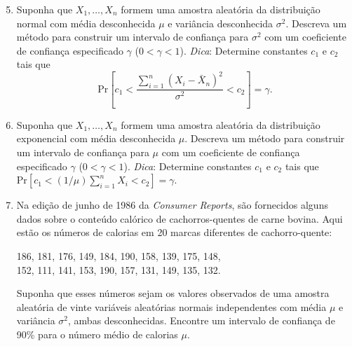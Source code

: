 \begin{enumerate}
    \setcounter{enumi}{4} %
    \item Suponha que $X_1, \dots, X_n$ formem uma amostra aleatória da distribuição normal com média desconhecida $\mu$ e variância desconhecida $\sigma^2$. Descreva um método para construir um intervalo de confiança para $\sigma^2$ com um coeficiente de confiança especificado $\gamma$ ($0 < \gamma < 1$). \textit{Dica}: Determine constantes $c_1$ e $c_2$ tais que
    $$ \text{Pr}\left[c_1 < \frac{\sum_{i=1}^{n}(X_i - \bar{X}_n)^2}{\sigma^2} < c_2\right] = \gamma. $$

    \item Suponha que $X_1, \dots, X_n$ formem uma amostra aleatória da distribuição exponencial com média desconhecida $\mu$. Descreva um método para construir um intervalo de confiança para $\mu$ com um coeficiente de confiança especificado $\gamma$ ($0 < \gamma < 1$). \textit{Dica}: Determine constantes $c_1$ e $c_2$ tais que $\text{Pr}[c_1 < (1/\mu)\sum_{i=1}^{n} X_i < c_2] = \gamma$.

    \item Na edição de junho de 1986 da \textit{Consumer Reports}, são fornecidos alguns dados sobre o conteúdo calórico de cachorros-quentes de carne bovina. Aqui estão os números de calorias em 20 marcas diferentes de cachorro-quente:
    \begin{center}
        186, 181, 176, 149, 184, 190, 158, 139, 175, 148, \\
        152, 111, 141, 153, 190, 157, 131, 149, 135, 132.
    \end{center}
    Suponha que esses números sejam os valores observados de uma amostra aleatória de vinte variáveis aleatórias normais independentes com média $\mu$ e variância $\sigma^2$, ambas desconhecidas. Encontre um intervalo de confiança de 90\% para o número médio de calorias $\mu$.
\end{enumerate}

